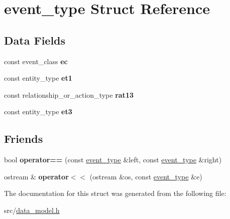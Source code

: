 \hypertarget{structevent__type}{}\section{event\+\_\+type Struct Reference}
\label{structevent__type}
\subsection*{Data Fields}
\begin{DoxyCompactItemize}
\item 
\mbox{\label{structevent__type_a56c49b8b98c18fb39797a92285387eca}} 
const event\+\_\+class {\bfseries ec}
\item 
\mbox{\label{structevent__type_a127abbfe7df2d4e442ef38c4d12b6dd2}} 
const entity\+\_\+type {\bfseries et1}
\item 
\mbox{\label{structevent__type_a7fe60f7b335a887a54c37c4b9fcfb400}} 
const relationship\+\_\+or\+\_\+action\+\_\+type {\bfseries rat13}
\item 
\mbox{\label{structevent__type_a685ac2668f6698357089949c495f6fe3}} 
const entity\+\_\+type {\bfseries et3}
\end{DoxyCompactItemize}
\subsection*{Friends}
\begin{DoxyCompactItemize}
\item 
\mbox{\label{structevent__type_ac6ea5340a97cf343356e390f082881de}} 
bool {\bfseries operator==} (const \hyperlink{structevent__type}{event\+\_\+type} \&left, const \hyperlink{structevent__type}{event\+\_\+type} \&right)
\item 
\mbox{\label{structevent__type_aaeec0fa308de88d46a6abc86499fe596}} 
ostream \& {\bfseries operator$<$$<$} (ostream \&os, const \hyperlink{structevent__type}{event\+\_\+type} \&e)
\end{DoxyCompactItemize}


The documentation for this struct was generated from the following file\+:\begin{DoxyCompactItemize}
\item 
src/\hyperlink{data__model_8h}{data\+\_\+model.\+h}\end{DoxyCompactItemize}
